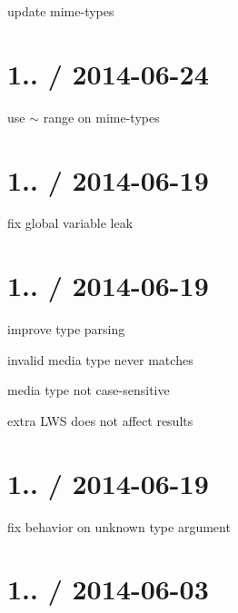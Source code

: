 \begin{DoxyItemize}
\item update mime-\/types
\end{DoxyItemize}

\section*{1.. / 2014-\/06-\/24 }


\begin{DoxyItemize}
\item use {\ttfamily $\sim$} range on mime-\/types
\end{DoxyItemize}

\section*{1.. / 2014-\/06-\/19 }


\begin{DoxyItemize}
\item fix global variable leak
\end{DoxyItemize}

\section*{1.. / 2014-\/06-\/19 }


\begin{DoxyItemize}
\item improve type parsing
\begin{DoxyItemize}
\item invalid media type never matches
\item media type not case-\/sensitive
\item extra L\+WS does not affect results
\end{DoxyItemize}
\end{DoxyItemize}

\section*{1.. / 2014-\/06-\/19 }


\begin{DoxyItemize}
\item fix behavior on unknown type argument
\end{DoxyItemize}

\section*{1.. / 2014-\/06-\/03 }


